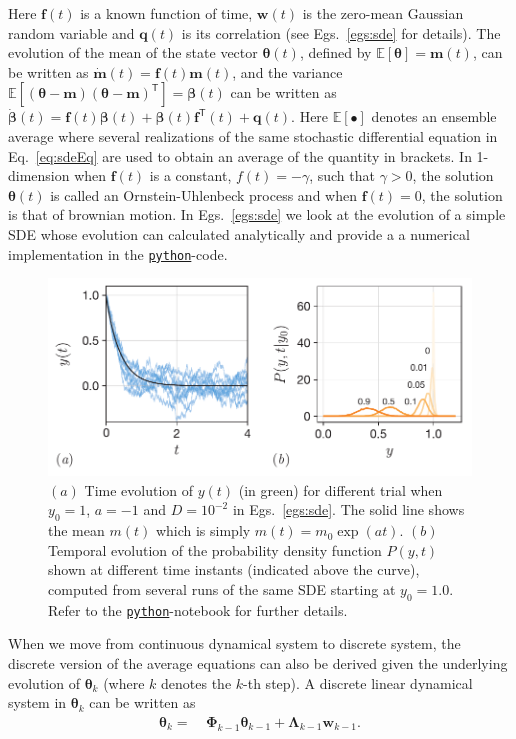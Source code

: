 \documentclass{resonance}
\def\E{\mathbb{E}}
\def\x{\bm{\theta}}
\def\th{\bm{\theta}}
\def\f{\bm{f}}
\def\w{\mathbf{w}}
\def\q{\mathbf{q}}
\def\m{\bm{m}}
\def\p{\bm{\beta}}
\def\T{\mathsf{T}}
\def\E{\mathbb{E}}
\def\PhiB{\boldsymbol{\Phi}}
\def\LambdaB{\boldsymbol{\Lambda}}
\begin{document}
Here $\f(t)$ is a known function of time, $\w(t)$ is the zero-mean Gaussian random variable and $\q(t)$ is its correlation (see Egs.~\ref{egs:sde} for details). The evolution of the mean of the state vector $\x(t)$, defined by $\E[\x] = \m(t) $, can be written as $ \dot{\m}(t) = \f(t) \m(t)$, and the variance $\E[(\x - \m)(\x - \m)^\T] = \p(t)$ can be written as $\dot{\p}(t) = \f(t) \p(t) + \p(t) \f^\T(t) + \q(t)$. Here $\E[\bullet]$ denotes an ensemble average where several realizations of the same stochastic differential equation in Eq.~\ref{eq:sdeEq} are used to obtain an average of the quantity in brackets. In 1-dimension when $\f(t)$ is a constant, $f(t) = -\gamma$, such that $\gamma > 0$, the solution $\th(t)$ is called an Ornstein-Uhlenbeck process and when $\f(t) = 0$, the solution is that of brownian motion. In Egs.~\ref{egs:sde} we look at the evolution of a simple SDE whose evolution can calculated analytically and provide a  a numerical implementation in the \href{https://github.com/sgangaprasath/KFTutorial/blob/main/KFTutorial.ipynb}{\texttt{python}}-code.

\begin{figure}
    \centering
    \includegraphics[width=\textwidth]{./figs/sde.pdf}
    \caption{$(a)$ Time evolution of $y(t)$ (in green) for different trial when $y_0=1$, $a=-1$ and $D=10^{-2}$ in Egs.~\ref{egs:sde}. The solid line shows the mean $m(t)$ which is simply $m(t) = m_0 \exp(at)$. $(b)$ Temporal evolution of the probability density function $P(y,t)$ shown at different time instants (indicated above the curve), computed from several runs of the same SDE starting at $y_0=1.0$. Refer to the \href{https://github.com/sgangaprasath/KFTutorial/blob/main/KFTutorial.ipynb}{\texttt{python}}-notebook for further details.}
    \label{fig:sdeFig}
\end{figure}

When we move from continuous dynamical system to discrete system, the discrete version of the average equations can also be derived given the underlying evolution of $\x_k$ (where $k$ denotes the $k$-th step). A discrete linear dynamical system in $\x_k$ can be written as
\begin{align}
\x_k =& \ \PhiB_{k-1} \x_{k-1} + \LambdaB_{k-1} \w_{k-1}.
\end{align}
\end{document}
